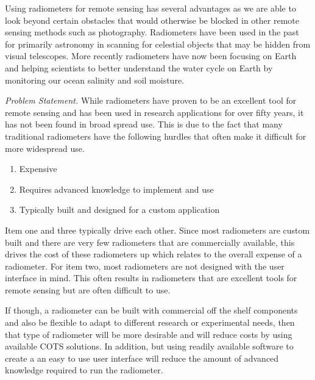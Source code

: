 Using radiometers for remote sensing has several advantages as we are able to look beyond certain obstacles that would otherwise be blocked in other remote sensing methods such as photography.  Radiometers have been used in the past for primarily astronomy in scanning for celestial objects that may be hidden from visual telescopes.  More recently radiometers have now been focusing on Earth and helping scientists to better understand the water cycle on Earth by monitoring our ocean salinity and soil moisture.  

\emph{Problem Statement.}  While radiometers have proven to be an excellent tool for remote sensing and has been used in research applications for over fifty years, it has not been found in broad spread use.  This is due to the fact that many traditional radiometers have the following hurdles that often make it difficult for more widespread use.

\begin{enumerate}
\item Expensive
\item Requires advanced knowledge to implement and use
\item Typically built and designed for a custom application
\end{enumerate}

Item one and three typically drive each other.  Since most radiometers are custom built and there are very few radiometers that are commercially available, this drives the cost of these radiometers up which relates to the overall expense of a radiometer.  For item two, most radiometers are not designed with the user interface in mind.  This often results in radiometers that are excellent tools for remote sensing but are often difficult to use.

If though, a radiometer can be built with commercial off the shelf components and also be flexible to adapt to different research or experimental needs, then that type of radiometer will be more desirable and will reduce costs by using available COTS solutions.  In addition, but using readily available software to create a an easy to use user interface will reduce the amount of advanced knowledge required to run the radiometer.

